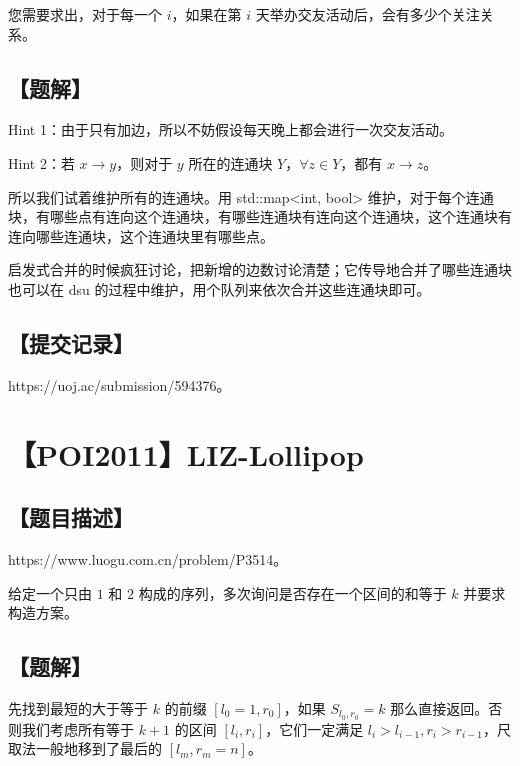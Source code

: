 \documentclass[UTF8,12pt,a4paper]{ctexart}
\begin{document}
	您需要求出，对于每一个 $i$，如果在第 $i$ 天举办交友活动后，会有多少个关注关系。
	
	\subsection*{【题解】}
	
	Hint 1：由于只有加边，所以不妨假设每天晚上都会进行一次交友活动。
	
	Hint 2：若 $x\rightarrow y$，则对于 $y$ 所在的连通块 $Y$，$\forall z\in Y$，都有 $x\rightarrow z$。
	
	所以我们试着维护所有的连通块。用 std::map<int, bool> 维护，对于每个连通块，有哪些点有连向这个连通块，有哪些连通块有连向这个连通块，这个连通块有连向哪些连通块，这个连通块里有哪些点。
	
	启发式合并的时候疯狂讨论，把新增的边数讨论清楚；它传导地合并了哪些连通块也可以在 dsu 的过程中维护，用个队列来依次合并这些连通块即可。
	
	\subsection*{【提交记录】}
	
	https://uoj.ac/submission/594376。
	
	
	\section*{【POI2011】LIZ-Lollipop}
	
	\subsection*{【题目描述】}
	
	https://www.luogu.com.cn/problem/P3514。
	
	给定一个只由 $1$ 和 $2$ 构成的序列，多次询问是否存在一个区间的和等于 $k$ 并要求构造方案。
	
	\subsection*{【题解】}
	
	先找到最短的大于等于 $k$ 的前缀 $[l_0=1,r_0]$，如果 $S_{l_0,r_0}=k$ 那么直接返回。否则我们考虑所有等于 $k+1$ 的区间 $[l_i,r_i]$，它们一定满足 $l_i>l_{i-1},r_i>r_{i-1}$，尺取法一般地移到了最后的 $[l_m,r_m=n]$。
	
\end{document}
